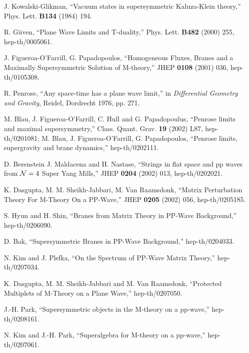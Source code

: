 \documentclass[a4paper,12pt]{article}
\begin{document}
\begin{thebibliography}{99}
  
 J. Kowalski-Glikman, ``Vacuum states in
  supersymmetric Kaluza-Klein theory,'' Phys. Lett. {\bf B134} (1984)
  194.

 R. G\"{u}ven, ``Plane Wave Limits and T-duality,''
  Phys. Lett. {\bf B482} (2000) 255, hep-th/0005061.

 J. Figueroa-O'Farrill, G. Papadopoulos, ``Homogeneous
  Fluxes, Branes and a Maximally Supersymmetric Solution of
  M-theory,'' JHEP {\bf 0108} (2001) 036, hep-th/0105308.

 R. Penrose, ``Any space-time has a plane wave
  limit,'' in {\it Differential Geometry and Gravity}, Reidel,
  Dordrecht 1976, pp. 271.
  
 M. Blau, J. Figueroa-O'Farrill, C. Hull and G.
  Papadopoulus, ``Penrose limits and maximal supersymmetry,'' Class.
  Quant. Grav. {\bf 19} (2002) L87, hep-th/0201081; M. Blau, J.
  Figueroa-O'Farrill, G. Papadopoulos, ``Penrose limits, supergravity
  and brane dynamics,'' hep-th/0202111.

 D. Berenstein J. Maldacena and H. Nastase, ``Strings
  in flat space and pp waves from ${\cal N} = 4$ Super Yang Mills,''
  JHEP {\bf 0204} (2002) 013, hep-th/0202021.

 K. Dasgupta, M. M. Sheikh-Jabbari, M. Van Raamsdonk,
  ``Matrix Perturbation Theory For M-Theory On a PP-Wave,'' JHEP {\bf
    0205} (2002) 056, hep-th/0205185.

 S. Hyun and H. Shin, ``Branes from Matrix Theory in
  PP-Wave Background,'' hep-th/0206090.
  
 D. Bak, ``Supersymmetric Branes in PP-Wave
  Background,'' hep-th/0204033.

 N. Kim and J. Plefka, ``On the Spectrum of PP-Wave
  Matrix Theory,'' hep-th/0207034.

 K. Dasgupta, M. M. Sheikh-Jabbari and M. Van
  Raamsdonk, ``Protected Multiplets of M-Theory on a Plane Wave,''
  hep-th/0207050.

 J.-H. Park, ``Supersymmetric objects in the M-theory 
on a pp-wave,'' hep-th/0208161.
 
 N. Kim and J.-H. Park, ``Superalgebra for M-theory on
  a pp-wave,'' hep-th/0207061.


\end{thebibliography}
\end{document}
